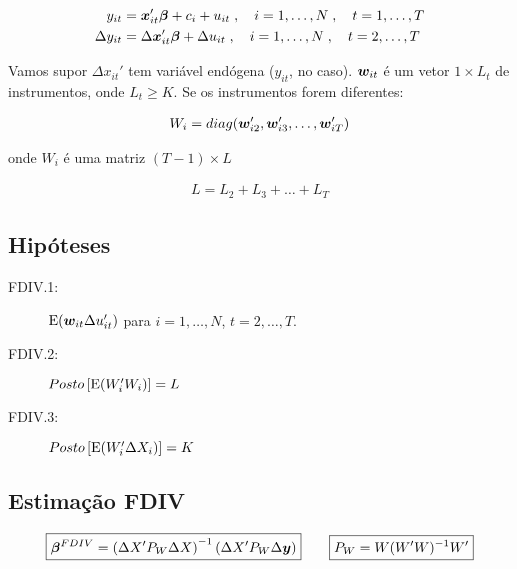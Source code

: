 \documentclass[11pt, oneside, a4paper, article]{article}
\numberwithin{equation}{section}
\begin{document}
\begin{description}
\vspace{-1 em}
\begin{align*}
y_{it} &= \boldsymbol{x}_{it}' \boldsymbol{\beta} + c_{i} + u_{it}
\; , \quad i = 1, \dots, N
\; , \quad t = 1, \dots, T
\\
\Delta y_{it} &= \Delta \boldsymbol{x}_{it}' \boldsymbol{\beta} + \Delta u_{it}
\; , \quad i = 1, \dots, N
\; , \quad t = 2, \dots, T
\end{align*}

Vamos supor $\Delta x_{it}'$ tem variável endógena ($y_{it}$, no caso).
$\boldsymbol{w}_{it}$ é um vetor $1 \times L_{t}$ de instrumentos, onde $L_{t} \geq K$.
Se os instrumentos forem diferentes:

\vspace{-1 em}
\begin{align*}
	W_{i} = diag( \boldsymbol{w}_{i2}', \boldsymbol{w}_{i3}', \dots, \boldsymbol{w}_{iT}')
\end{align*}

\noindent
onde $W_{i}$ é uma matriz $( T - 1 ) \times L$

\vspace{-1 em}
\begin{align*}
	L = L_{2} + L_{3} + \dots + L_{T}
\end{align*}

\subsection{Hipóteses}

\begin{description}
\item[FDIV.1:] $\text{E}( \boldsymbol{w}_{it} \Delta u_{it}')$ para $i = 1, \dots, N$, $t = 2, \dots, T$.
\item[FDIV.2:] $Posto\left[ \text{E}( W_{i}' W_{i} ) \right] = L$
\item[FDIV.3:] $Posto\left[ \text{E}( W_{i}' \Delta X_{i} ) \right] = K$
\end{description}

\subsection{Estimação FDIV}

\vspace{-1 em}
\begin{align*}
\boxed{
\boldsymbol{\beta}^{FDIV} =  
\left(
\Delta X' P_{W} \Delta X 
\right)^{-1}
\left(
\Delta X' P_{W} \Delta \boldsymbol{y}
\right)
}
\qquad
\boxed{
P_{W} = W(W'W)^{-1}W'}
\end{align*}


\end{description}
\end{document}
